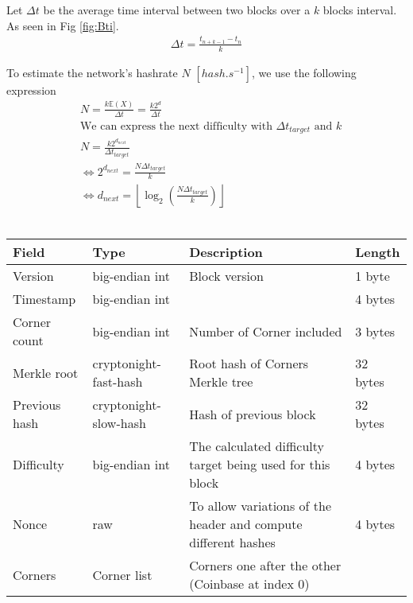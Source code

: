 \documentclass[a4paper,10pt]{article}
\begin{document}
            Let $\Delta t$ be the average time interval between two blocks over a $k$ blocks interval.
            As seen in Fig \ref{fig:Bti}.
            \begin {align*}
             \Delta t = \frac{t_{n+k-1} - t_n}{k}
            \end {align*}

            
            To estimate the network's hashrate $N$ $[hash.s^{-1}]$, we use the following expression\\
            
            
            \begin {align*}
                &\text{}N = \frac{k\mathbb{E}(X)}{\Delta t} = \frac{k2^d}{\Delta t}\\
                &\text{We can express the next difficulty with ${\Delta t}_{target}$ and $k$}\\
                &N = \frac{k2^{d_{next}}}{{\Delta t}_{target}}\\
                &\Leftrightarrow 2^{d_{next}} = \frac{N{\Delta t}_{target}}{k}\\
                &\Leftrightarrow d_{next} = \left\lfloor\log_2\left(\frac{N{\Delta t}_{target}}{k}\right)\right\rfloor
            \end {align*}\\
            
            
            \noindent\begin{tabularx}{\textwidth}{|l|l|X|l|}
            \hline Field & Type & Description & Length \\ \hline
            \hline Version & big-endian int & Block version & 1 byte \\
            \hline Timestamp & big-endian int & & 4 bytes\\
            \hline Corner count & big-endian int & Number of Corner included & 3 bytes\\
            \hline Merkle root & cryptonight-fast-hash & Root hash of Corners Merkle tree & 32 bytes\\
            \hline Previous hash & cryptonight-slow-hash & Hash of previous block & 32 bytes\\
            \hline Difficulty & big-endian int & The calculated difficulty target being used for this block & 4 bytes\\
            \hline Nonce & raw & To allow variations of the header and compute different hashes & 4 bytes \\
            \hline
            \hline Corners & Corner list & Corners one after the other (Coinbase at index 0) & \\
            \hline
            \end{tabularx}
        
\end{document}
